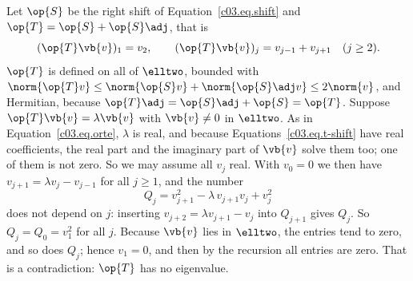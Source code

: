 \begin{vertiefung}[id=c03.v7,
    titel={A Hermitian operator without eigenvectors},
    wozu={In the core every Hermitian operator can be diagonalised
      (Theorem~\ref{c03.thm.spektral}). In infinitely many dimensions this is no longer true:
      here is a bounded Hermitian operator on $\elltwo$ that has not a single eigenvector, and
      what takes the place of the eigenbasis.},
    voraussetzung={Theorem~\ref{c03.thm.spektral}; blocks~\ref{c03.v1}, \ref{c03.v5}
      and~\ref{c03.v6} (the right shift). The core up to Chapter~4 does not need this block;
      Chapter~5 takes the subject up again with position and momentum.},
    zurueck={In finite dimension every Hermitian operator has an orthonormal basis of
      eigenvectors. In infinitely many dimensions a Hermitian operator can be entirely without
      eigenvectors; the general spectral theorem then replaces the eigenbasis.}]
  \begin{example}\label{c03.ex.ohne-eigen}
    Let $\op{S}$ be the right shift of Equation~\eqref{c03.eq.shift} and
    $\op{T} = \op{S} + \op{S}\adj$, that is
    \begin{equation}\label{c03.eq.t-shift}
      (\op{T}\vb{v})_1 = v_2 ,
      \qquad
      (\op{T}\vb{v})_j = v_{j-1} + v_{j+1} \quad (j \geq 2) .
    \end{equation}
    $\op{T}$ is defined on all of $\elltwo$, bounded with
    $\norm{\op{T}v} \leq \norm{\op{S}v} + \norm{\op{S}\adj v} \leq 2\norm{v}$, and Hermitian,
    because $\op{T}\adj = \op{S}\adj + \op{S} = \op{T}$. Suppose $\op{T}\vb{v} = \lambda\vb{v}$
    with $\vb{v} \neq 0$ in $\elltwo$. As in Equation~\eqref{c03.eq.orte}, $\lambda$ is real,
    and because Equations~\eqref{c03.eq.t-shift} have real coefficients, the real part and the
    imaginary part of $\vb{v}$ solve them too; one of them is not zero. So we may assume all
    $v_j$ real. With $v_0 = 0$ we then have $v_{j+1} = \lambda v_j - v_{j-1}$ for all
    $j \geq 1$, and the number
    \begin{equation}\label{c03.eq.erhaltung}
      Q_j = v_{j+1}^2 - \lambda\, v_{j+1} v_j + v_j^2
    \end{equation}
    does not depend on $j$: inserting $v_{j+2} = \lambda v_{j+1} - v_j$ into $Q_{j+1}$ gives
    $Q_j$. So $Q_j = Q_0 = v_1^2$ for all $j$. Because $\vb{v}$ lies in $\elltwo$, the entries
    tend to zero, and so does $Q_j$; hence $v_1 = 0$, and then by the recursion all entries are
    zero. That is a contradiction: $\op{T}$ has no eigenvalue.
  \end{example}


\end{vertiefung}
